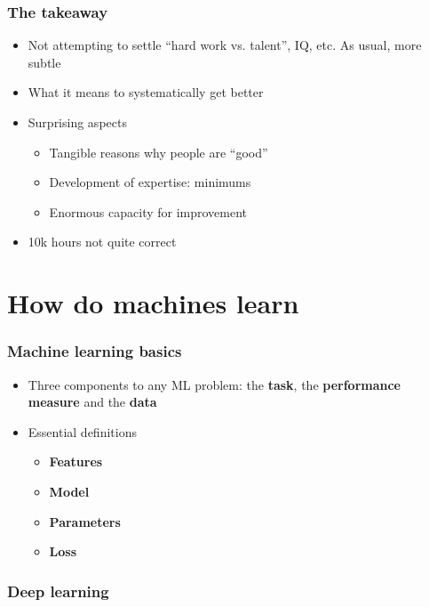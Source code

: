 \documentclass{beamer}
\begin{document}
\begin{frame}
  \frametitle{The takeaway}
  \begin{itemize}
    \item Not attempting to settle ``hard work vs. talent'', IQ, etc. As usual, more subtle
    \item What it means to systematically get better
    \item Surprising aspects
      \begin{itemize}
        \item Tangible reasons why people are ``good''
        \item Development of expertise: minimums
        \item Enormous capacity for improvement
      \end{itemize}
    \item 10k hours not quite correct
  \end{itemize}
\end{frame}

\section{How do machines learn}

\begin{frame}
  \frametitle{Machine learning basics}
  \begin{itemize}
      \item Three components to any ML problem: the \textbf{task}, the \textbf{performance measure} and the \textbf{data}
      \item Essential definitions
      \begin{itemize}
          \item \textbf{Features}
          \item \textbf{Model}
          \item \textbf{Parameters}
          \item \textbf{Loss}
      \end{itemize}
  \end{itemize}
\end{frame}


\begin{frame}
  \frametitle{Deep learning}
\end{frame}
\end{document}
